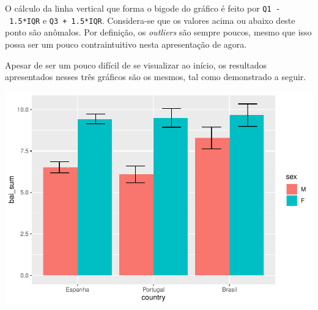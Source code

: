 \documentclass[
]{book}
\newenvironment{Shaded}{\begin{snugshade}}{\end{snugshade}}
\newcommand{\CommentTok}[1]{\textcolor[rgb]{0.56,0.35,0.01}{\textit{#1}}}
\newcommand{\DataTypeTok}[1]{\textcolor[rgb]{0.13,0.29,0.53}{#1}}
\newcommand{\DecValTok}[1]{\textcolor[rgb]{0.00,0.00,0.81}{#1}}
\newcommand{\FloatTok}[1]{\textcolor[rgb]{0.00,0.00,0.81}{#1}}
\newcommand{\KeywordTok}[1]{\textcolor[rgb]{0.13,0.29,0.53}{\textbf{#1}}}
\newcommand{\NormalTok}[1]{#1}
\newcommand{\OperatorTok}[1]{\textcolor[rgb]{0.81,0.36,0.00}{\textbf{#1}}}
\newcommand{\StringTok}[1]{\textcolor[rgb]{0.31,0.60,0.02}{#1}}
\begin{document}
O cálculo da linha vertical que forma o bigode do gráfico é feito por \texttt{Q1\ -\ 1.5*IQR} e \texttt{Q3\ +\ 1.5*IQR}. Considera-se que os valores acima ou abaixo deste ponto são anômalos. Por definição, os \emph{outliers} são sempre poucos, mesmo que isso possa ser um pouco contraintuitivo nesta apresentação de agora.

Apesar de ser um pouco difícil de se visualizar ao início, os resultados apresentados nesses três gráficos são os mesmos, tal como demonstrado a seguir.

\begin{Shaded}
\end{Shaded}

\begin{center}\includegraphics{gitbook-demo_files/figure-latex/unnamed-chunk-25-1} \end{center}
\end{document}

